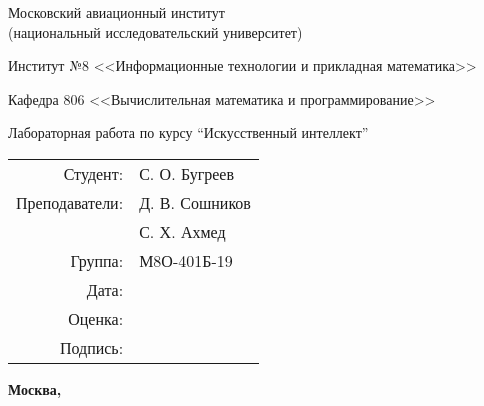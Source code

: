\begin{titlepage}
\begin{center}
\bfseries

{\Large Московский авиационный институт \\ (национальный исследовательский университет)

}

\vspace{48pt}

{\large Институт №8 <<Информационные технологии и прикладная математика>>
}

\vspace{36pt}

{\large Кафедра 806 <<Вычислительная математика и программирование>>

}

\vspace{48pt}

Лабораторная работа  по курсу \enquote{Искусственный интеллект}

\end{center}

\vspace{72pt}

\begin{flushright}
\begin{tabular}{rl}
Студент: & С. О. Бугреев \\
Преподаватели: & Д. В. Сошников\\
& С. Х. Ахмед\\
Группа: & М8О-401Б-19 \\
Дата: & \\
Оценка: & \\
Подпись: & \\
\end{tabular}
\end{flushright}

\vfill

\begin{center}
\bfseries
Москва, \the\year
\end{center}
\end{titlepage}

\pagebreak
